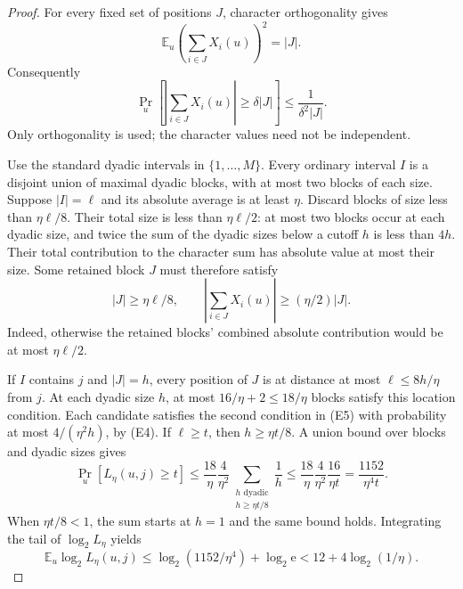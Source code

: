\documentclass[11pt]{article}
\theoremstyle{definition}
\newcommand{\Eul}{\mathrm e}
\begin{document}
\begin{proof}
For every fixed set of positions \(J\), character orthogonality gives
\[
 \mathbb E_u\left(\sum_{i\in J}X_i(u)\right)^2=|J|.
\]
Consequently
\[
 \Pr_u\left[
   \left|\sum_{i\in J}X_i(u)\right|\ge\delta|J|
 \right]\le\frac1{\delta^2|J|}.                           \tag{E4}
\]
Only orthogonality is used; the character values need not be independent.

Use the standard dyadic intervals in \(\{1,\ldots,M\}\). Every ordinary
interval \(I\) is a disjoint union of maximal dyadic blocks, with at most
two blocks of each size. Suppose \(|I|=\ell\) and its absolute average is
at least \(\eta\). Discard blocks of size less than \(\eta\ell/8\).
Their total size is less than \(\eta\ell/2\): at most two blocks occur
at each dyadic size, and twice the sum of the dyadic sizes below a cutoff
\(h\) is less than \(4h\). Their total contribution to the character sum has absolute
value at most their size. Some retained block \(J\) must therefore satisfy
\[
 |J|\ge\eta\ell/8,
 \qquad
 \left|\sum_{i\in J}X_i(u)\right|
       \ge(\eta/2)|J|.                                  \tag{E5}
\]
Indeed, otherwise the retained blocks' combined absolute contribution
would be at most \(\eta\ell/2\).

If \(I\) contains \(j\) and \(|J|=h\), every position of \(J\) is at
distance at most \(\ell\le8h/\eta\) from \(j\). At each dyadic size
\(h\), at most \(16/\eta+2\le18/\eta\) blocks satisfy this location
condition. Each candidate satisfies the second condition in (E5) with
probability at most \(4/(\eta^2h)\), by (E4). If \(\ell\ge t\), then
\(h\ge\eta t/8\). A union bound over blocks and dyadic sizes gives
\[
 \Pr_u[L_\eta(u,j)\ge t]
 \le \frac{18}{\eta}\frac4{\eta^2}
       \sum_{\substack{h\text{ dyadic}\\h\ge\eta t/8}}\frac1h
 \le \frac{18}{\eta}\frac4{\eta^2}\frac{16}{\eta t}
 =\frac{1152}{\eta^4t}.
\]
When \(\eta t/8<1\), the sum starts at \(h=1\) and the same bound
holds. Integrating the tail of \(\log_2L_\eta\) yields
\[
 \mathbb E_u\log_2L_\eta(u,j)
 \le\log_2(1152/\eta^4)+\log_2\Eul
 <12+4\log_2(1/\eta).
\]
\end{proof}
\end{document}
